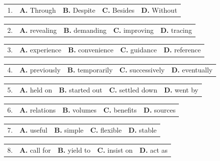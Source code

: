 \documentclass[UTF8,11pt]{ctexart}
\begin{document}
\noindent\begin{tabularx}{\linewidth}{@{}lXXXX@{}}1. & \textbf{A.} Through & \textbf{B.} Despite & \textbf{C.} Besides & \textbf{D.} Without\\\end{tabularx}\par

\noindent\begin{tabularx}{\linewidth}{@{}lXXXX@{}}2. & \textbf{A.} revealing & \textbf{B.} demanding & \textbf{C.} improving & \textbf{D.} tracing\\\end{tabularx}\par

\noindent\begin{tabularx}{\linewidth}{@{}lXXXX@{}}3. & \textbf{A.} experience & \textbf{B.} convenience & \textbf{C.} guidance & \textbf{D.} reference\\\end{tabularx}\par

\noindent\begin{tabularx}{\linewidth}{@{}lXXXX@{}}4. & \textbf{A.} previously & \textbf{B.} temporarily & \textbf{C.} successively & \textbf{D.} eventually\\\end{tabularx}\par

\noindent\begin{tabularx}{\linewidth}{@{}lXXXX@{}}5. & \textbf{A.} held on & \textbf{B.} started out & \textbf{C.} settled down & \textbf{D.} went by\\\end{tabularx}\par

\noindent\begin{tabularx}{\linewidth}{@{}lXXXX@{}}6. & \textbf{A.} relations & \textbf{B.} volumes & \textbf{C.} benefits & \textbf{D.} sources\\\end{tabularx}\par

\noindent\begin{tabularx}{\linewidth}{@{}lXXXX@{}}7. & \textbf{A.} useful & \textbf{B.} simple & \textbf{C.} flexible & \textbf{D.} stable\\\end{tabularx}\par

\noindent\begin{tabularx}{\linewidth}{@{}lXXXX@{}}8. & \textbf{A.} call for & \textbf{B.} yield to & \textbf{C.} insist on & \textbf{D.} act as\\\end{tabularx}\par
\end{document}
